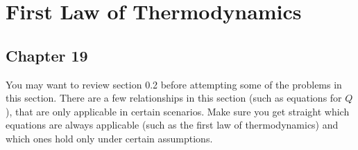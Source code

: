 \documentclass[12pt]{book}
\begin{document}
\chapter{First Law of Thermodynamics}

\section{Chapter 19}

You may want to review section 0.2 before attempting some of the problems in this section. There are a few relationships in this section (such as equations for $Q$), that are only applicable in certain scenarios. Make sure you get straight which equations are always applicable (such as the first law of thermodynamics) and which ones hold only under certain assumptions.
\end{document}
